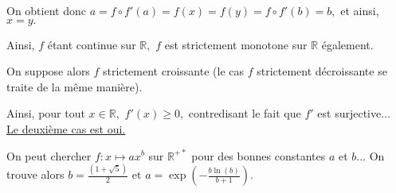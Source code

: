 On obtient donc $a=f\circ f'(a)=f(x)=f(y)=f\circ f'(b)=b,$ et ainsi, $x=y.$ 

Ainsi, $f$ étant continue sur $\mathbb{R},$ $f$ est strictement monotone sur $\mathbb{R}$ également.

On suppose alors $f$ strictement croissante (le cas $f$ strictement décroissante se traite de la même manière).

Ainsi, pour tout $x\in\mathbb{R},$ $\displaystyle f'(x)\geq 0,$ contredisant le fait que $f'$ est surjective...\\

\underline{ Le deuxième cas est oui.}

On peut chercher $f :x \mapsto ax^{b}$ sur $\mathbb{R}^{+*}$ pour des bonnes constantes $a$ et $b$... On trouve alors $\displaystyle b=\frac{(1+\sqrt{5})}{2} \mbox{ et } a=\exp(-\frac{b\ln(b)}{b+1}).$








